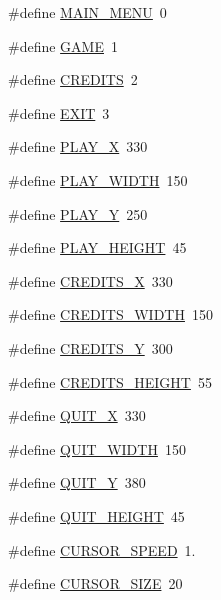 \begin{DoxyCompactItemize}
\item 
\#define \mbox{\hyperlink{group__main__menu_ga44dd1b46a3f55007e78fc1ac506153b9}{M\+A\+I\+N\+\_\+\+M\+E\+NU}}~0
\item 
\#define \mbox{\hyperlink{group__main__menu_ga81dbe4cce536eb83872b539079ba4139}{G\+A\+ME}}~1
\item 
\#define \mbox{\hyperlink{group__main__menu_ga28017dea6f5becdb38eba6eac6f51bbc}{C\+R\+E\+D\+I\+TS}}~2
\item 
\#define \mbox{\hyperlink{group__main__menu_gad111e603bbebe5d87f6bc39264ce4733}{E\+X\+IT}}~3
\item 
\#define \mbox{\hyperlink{group__main__menu_ga601a4ab83713dad6008bf74c4c347914}{P\+L\+A\+Y\+\_\+X}}~330
\item 
\#define \mbox{\hyperlink{group__main__menu_gab3b9dbde965b2ad8e2b7720c26eded37}{P\+L\+A\+Y\+\_\+\+W\+I\+D\+TH}}~150
\item 
\#define \mbox{\hyperlink{group__main__menu_ga9e84b26e342c1df4348efbfa6694bccd}{P\+L\+A\+Y\+\_\+Y}}~250
\item 
\#define \mbox{\hyperlink{group__main__menu_ga265d0b9390156ec1520c0f68c3431c6c}{P\+L\+A\+Y\+\_\+\+H\+E\+I\+G\+HT}}~45
\item 
\#define \mbox{\hyperlink{group__main__menu_gaeb9fff4c05c42ce4f00cbfe3622b63d0}{C\+R\+E\+D\+I\+T\+S\+\_\+X}}~330
\item 
\#define \mbox{\hyperlink{group__main__menu_gac8aca0d07f517982d67af5081ed2b4f4}{C\+R\+E\+D\+I\+T\+S\+\_\+\+W\+I\+D\+TH}}~150
\item 
\#define \mbox{\hyperlink{group__main__menu_ga2e441d1c4e7d198f1f0d0eb60d331d86}{C\+R\+E\+D\+I\+T\+S\+\_\+Y}}~300
\item 
\#define \mbox{\hyperlink{group__main__menu_gac970a6c034ab2b622434972ef2205935}{C\+R\+E\+D\+I\+T\+S\+\_\+\+H\+E\+I\+G\+HT}}~55
\item 
\#define \mbox{\hyperlink{group__main__menu_ga3040de9a6158b6f62ae7a78d32deffb9}{Q\+U\+I\+T\+\_\+X}}~330
\item 
\#define \mbox{\hyperlink{group__main__menu_ga8e5034a101e70e1f511a56f70f32ad37}{Q\+U\+I\+T\+\_\+\+W\+I\+D\+TH}}~150
\item 
\#define \mbox{\hyperlink{group__main__menu_gae60f4142599ff024b4d8d2ca3ebe42e7}{Q\+U\+I\+T\+\_\+Y}}~380
\item 
\#define \mbox{\hyperlink{group__main__menu_ga3f826023eb74f14d5f48cd11d5385e0a}{Q\+U\+I\+T\+\_\+\+H\+E\+I\+G\+HT}}~45
\item 
\#define \mbox{\hyperlink{group__main__menu_ga5de99031704f5a4356e8fb30d56c4986}{C\+U\+R\+S\+O\+R\+\_\+\+S\+P\+E\+ED}}~1.
\item 
\#define \mbox{\hyperlink{group__main__menu_gae541f04deda5a9c9683f7f3866175023}{C\+U\+R\+S\+O\+R\+\_\+\+S\+I\+ZE}}~20
\end{DoxyCompactItemize}
